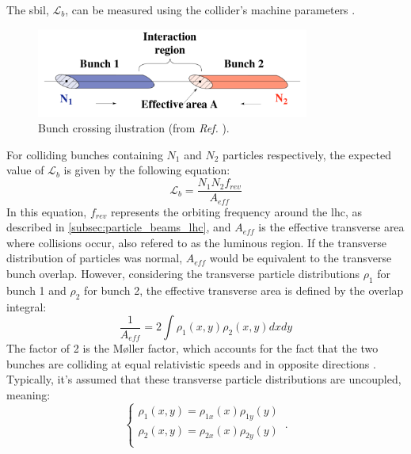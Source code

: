 The \acrfull{sbil}, $\mathcal{L}_b$, can be measured using the collider's machine parameters \cite{Burkhardt:1056691}.
\begin{figure}[h]
    \centering
    \includegraphics[width=0.8\textwidth]{images/assets/bunch_crossing.png}
    \caption[Bunch crossing illustration]{Bunch crossing ilustration (from \textit{Ref.} \cite{Burkhardt:1056691}).}
    \label{fig:bunch_crossing}
\end{figure}
For colliding bunches containing $N_1$ and $N_2$ particles respectively, the expected value of $\mathcal{L}_b$ is given by the following equation:
\begin{equation}
    \label{eq:sbil-machine-params}
    \mathcal{L}_b = \frac{N_1 N_2 f_{rev}}{A_{eff}}
\end{equation}
In this equation, $f_{rev}$ represents the orbiting frequency around the \acrshort{lhc}, as described in \autoref{subsec:particle_beams_lhc}, and $A_{eff}$ is the effective transverse area where collisions occur, also refered to as the luminous region. If the transverse distribution of particles was normal, $A_{eff}$ would be equivalent to the transverse bunch overlap. However, considering the transverse particle distributions $\rho_1$ for bunch 1 and $\rho_2$ for bunch 2, the effective transverse area is defined by the overlap integral:
\begin{equation}
    \label{eq:effective-area}
    \frac{1}{A_{eff}} = 2 \int \rho_1(x,y) \rho_2(x,y) dxdy
\end{equation}
The factor of 2 is the Møller factor, which accounts for the fact that the two bunches are colliding at equal relativistic speeds and in opposite directions \cite{furman2003moeller}. Typically, it's assumed that these transverse particle distributions are uncoupled, meaning: 
\begin{equation}
    \begin{cases}
		\rho_1 \left(x, y \right) = \rho_{1x} \left( x \right) \rho_{1y} \left( y \right) \\
		\rho_2 \left(x, y \right) = \rho_{2x} \left( x \right) \rho_{2y} \left( y \right) \\
    \end{cases}\,.
\end{equation}
